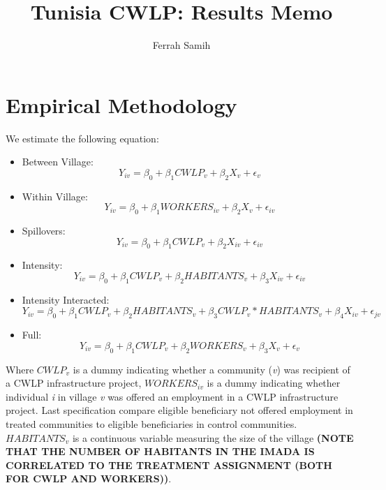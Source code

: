 \documentclass[10pt,a4paper]{article}
\begin{document}
\author{Ferrah Samih}\title{Tunisia CWLP: Results Memo}\maketitle
\pagebreak
\listoffigures
\pagebreak

\section{Empirical Methodology}


We estimate the following equation:
\begin{itemize}
	\item Between Village: \begin{equation} Y_{iv} = \beta_{0} + \beta_{1}CWLP_{v} + \beta_{2}X_{v} + \epsilon_{v} \end{equation}
	
	\item Within Village: \begin{equation} Y_{iv} = \beta_{0} + \beta_{1}WORKERS_{iv} + \beta_{2}X_{v} + \epsilon_{iv} \end{equation}
	
	\item Spillovers: \begin{equation} Y_{iv} = \beta_{0} + \beta_{1}CWLP_{v} + \beta_{2}X_{iv} + \epsilon_{iv} \end{equation}
	
	\item Intensity: \begin{equation} Y_{iv} = \beta_{0} + \beta_{1}CWLP_{v} + \beta_{2}HABITANTS_{v} + \beta_{3}X_{iv} + \epsilon_{iv} \end{equation}
	
	\item Intensity Interacted: \begin{equation} Y_{iv} = \beta_{0} + \beta_{1}CWLP_{v} + \beta_{2}HABITANTS_{v} + \beta_{3}CWLP_{v}*HABITANTS_{v} + \beta_{4}X_{iv} + \epsilon_{jv} \end{equation}
	
	\item Full: \begin{equation} Y_{iv} = \beta_{0} + \beta_{1}CWLP_{v} + \beta_{2}WORKERS_{v} + \beta_{3}X_{v} + \epsilon_{v} \end{equation}
	
\end{itemize}

Where $CWLP_{v}$ is a dummy indicating whether a community (\textit{v}) was recipient of a CWLP infrastructure project, $WORKERS_{iv}$ is a dummy indicating whether individual \textit{i} in village \textit{v} was offered an employment in a CWLP infrastructure project. Last specification compare eligible beneficiary not offered employment in treated communities to eligible beneficiaries in control communities. $HABITANTS_{v}$ is a continuous variable measuring the size of the village \textbf{(NOTE THAT THE NUMBER OF HABITANTS IN THE IMADA IS CORRELATED TO THE TREATMENT ASSIGNMENT (BOTH FOR CWLP AND WORKERS))}. 
\end{document}
